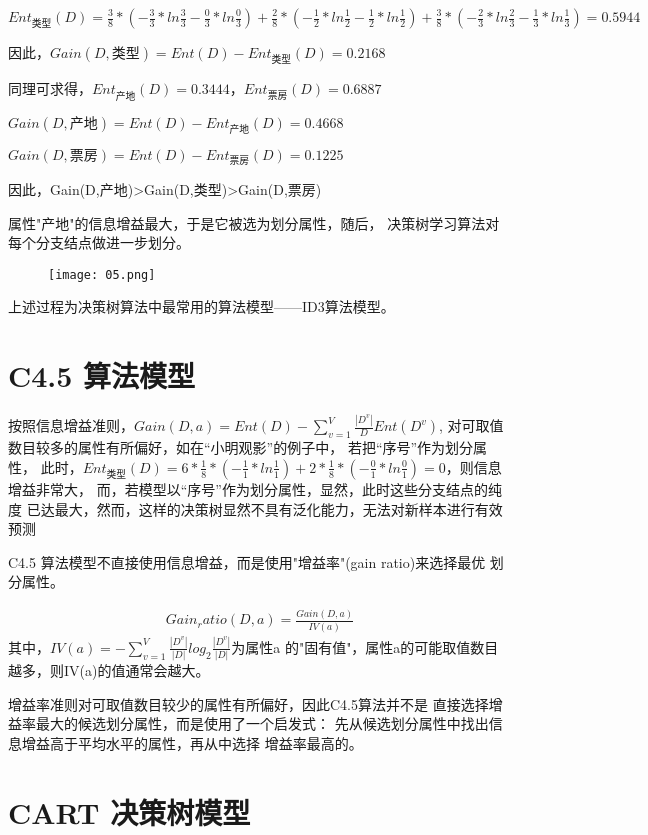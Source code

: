 \documentclass[12pt]{article}
\begin{document}
$Ent_{类型}(D)=\frac{3}{8}*(-\frac{3}{3}*ln\frac{3}{3}-\frac{0}{3}*ln\frac{0}{3})
+\frac{2}{8}*(-\frac{1}{2}*ln\frac{1}{2}-\frac{1}{2}*ln\frac{1}{2})
+\frac{3}{8}*(-\frac{2}{3}*ln\frac{2}{3}-\frac{1}{3}*ln\frac{1}{3})=0.5944$

因此，$Gain(D,类型)=Ent(D)-Ent_{类型}(D)=0.2168$

同理可求得，$Ent_{产地}(D)=0.3444，Ent_{票房}(D)=0.6887$

$Gain(D,产地)=Ent(D)-Ent_{产地}(D)=0.4668$

$Gain(D,票房)=Ent(D)-Ent_{票房}(D)=0.1225$

因此，Gain(D,产地)>Gain(D,类型)>Gain(D,票房)

属性"产地"的信息增益最大，于是它被选为划分属性，随后，
决策树学习算法对每个分支结点做进一步划分。

\begin{figure}[htbp]
	\centering
	\texttt{[image: 05.png]}
\end{figure}

上述过程为决策树算法中最常用的算法模型——ID3算法模型。

\section{C4.5 算法模型}

按照信息增益准则，$Gain(D,a)=Ent(D)-\sum_{v = 1}^{V}\frac{|D^v|}{D}Ent(D^v)$,
对可取值数目较多的属性有所偏好，如在“小明观影”的例子中，
若把“序号”作为划分属性，
此时，$Ent_{类型}(D)=6*\frac{1}{8}*(-\frac{1}{1}*ln\frac{1}{1})
+2*\frac{1}{8}*(-\frac{0}{1}*ln\frac{0}{1})=0$，则信息增益非常大，
而，若模型以“序号”作为划分属性，显然，此时这些分支结点的纯度
已达最大，然而，这样的决策树显然不具有泛化能力，无法对新样本进行有效预测

C4.5 算法模型不直接使用信息增益，而是使用"增益率"(gain ratio)来选择最优
划分属性。

\begin{align}
	Gain_ratio(D,a)=\frac{Gain(D,a)}{IV(a)}
\end{align}
其中，$IV(a)=-\sum_{v = 1}^{V} \frac{|D^v|}{|D|}log_2 \frac{|D^v|}{|D|}  $为属性a
的"固有值"，属性a的可能取值数目越多，则IV(a)的值通常会越大。

增益率准则对可取值数目较少的属性有所偏好，因此C4.5算法并不是
直接选择增益率最大的候选划分属性，而是使用了一个启发式：
先从候选划分属性中找出信息增益高于平均水平的属性，再从中选择
增益率最高的。

\section{CART 决策树模型}
\end{document}
